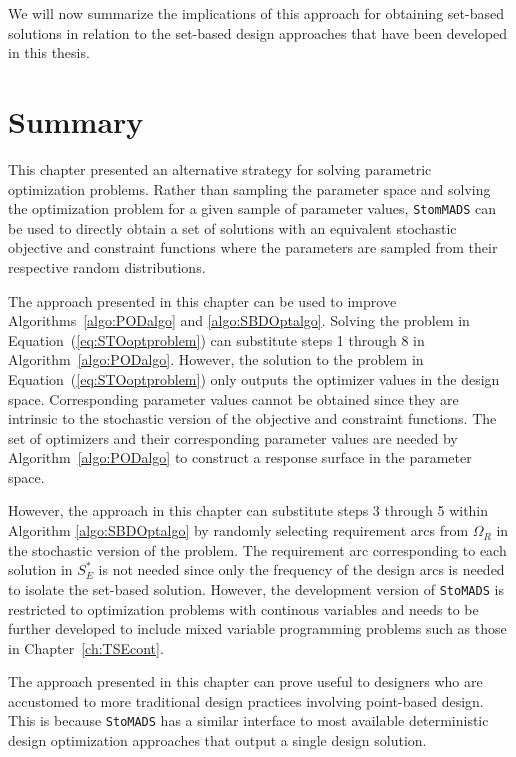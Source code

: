 We will now summarize the implications of this approach for obtaining set-based solutions in relation to the set-based design approaches that have been developed in this thesis.

\section{Summary}
\label{sec:stohasticoptsummary}

This chapter presented an alternative strategy for solving parametric optimization problems. Rather than sampling the parameter space and solving the optimization problem for a given sample of parameter values, \texttt{StomMADS} can be used to directly obtain a set of solutions with an equivalent stochastic objective and constraint functions where the parameters are sampled from their respective random distributions.

The approach presented in this chapter can be used to improve Algorithms~\ref{algo:PODalgo} and \ref{algo:SBDOptalgo}. Solving the problem in Equation~(\ref{eq:STOoptproblem}) can substitute steps 1 through 8 in Algorithm~\ref{algo:PODalgo}. However, the solution to the problem in Equation~(\ref{eq:STOoptproblem}) only outputs the optimizer values in the design space. Corresponding parameter values cannot be obtained since they are intrinsic to the stochastic version of the objective and constraint functions. The set of optimizers and their corresponding parameter values are needed by Algorithm~\ref{algo:PODalgo} to construct a response surface in the parameter space.

However, the approach in this chapter can substitute steps 3 through 5 within Algorithm \ref{algo:SBDOptalgo} by randomly selecting requirement arcs from $\Omega_R$ in the stochastic version of the problem. The requirement arc corresponding to each solution in $S_{E}^*$ is not needed since only the frequency of the design arcs is needed to isolate the set-based solution. However, the development version of \texttt{StoMADS} is restricted to optimization problems with continous variables and needs to be further developed to include mixed variable programming problems such as those in Chapter~\ref{ch:TSEcont}.

The approach presented in this chapter can prove useful to designers who are accustomed to more traditional design practices involving point-based design. This is because \texttt{StoMADS} has a similar interface to most available deterministic design optimization approaches that output a single design solution.